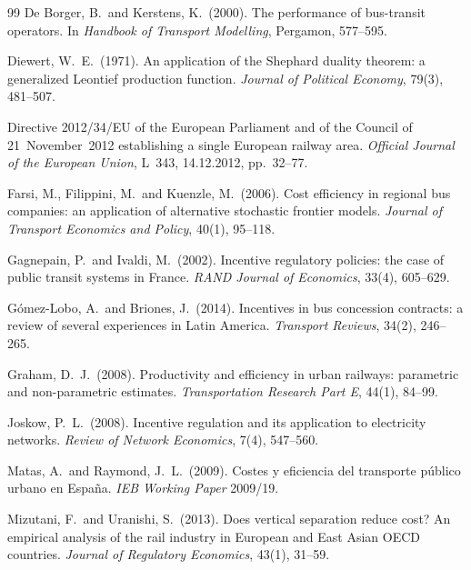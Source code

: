 \documentclass[11pt,a4paper]{article}
\begin{document}
{\begin{thebibliography}{99}
De Borger, B.\ and Kerstens, K.\ (2000).
The performance of bus-transit operators.
In \textit{Handbook of Transport Modelling}, Pergamon, 577--595.

Diewert, W.~E.\ (1971).
An application of the Shephard duality theorem: a generalized Leontief
production function.
\textit{Journal of Political Economy}, 79(3), 481--507.

Directive 2012/34/EU of the European Parliament and of the Council of
21~November~2012 establishing a single European railway area.
\textit{Official Journal of the European Union}, L~343, 14.12.2012,
pp.~32--77.

Farsi, M., Filippini, M.\ and Kuenzle, M.\ (2006).
Cost efficiency in regional bus companies: an application of
alternative stochastic frontier models.
\textit{Journal of Transport Economics and Policy}, 40(1), 95--118.

Gagnepain, P.\ and Ivaldi, M.\ (2002).
Incentive regulatory policies: the case of public transit systems in
France.
\textit{RAND Journal of Economics}, 33(4), 605--629.

G\'omez-Lobo, A.\ and Briones, J.\ (2014).
Incentives in bus concession contracts: a review of several experiences
in Latin America.
\textit{Transport Reviews}, 34(2), 246--265.

Graham, D.~J.\ (2008).
Productivity and efficiency in urban railways: parametric and
non-parametric estimates.
\textit{Transportation Research Part E}, 44(1), 84--99.

Joskow, P.~L.\ (2008).
Incentive regulation and its application to electricity networks.
\textit{Review of Network Economics}, 7(4), 547--560.

Matas, A.\ and Raymond, J.~L.\ (2009).
Costes y eficiencia del transporte p\'ublico urbano en Espa\~na.
\textit{IEB Working Paper} 2009/19.

Mizutani, F.\ and Uranishi, S.\ (2013).
Does vertical separation reduce cost? An empirical analysis of the rail
industry in European and East Asian OECD countries.
\textit{Journal of Regulatory Economics}, 43(1), 31--59.


\end{thebibliography}}
\end{document}
